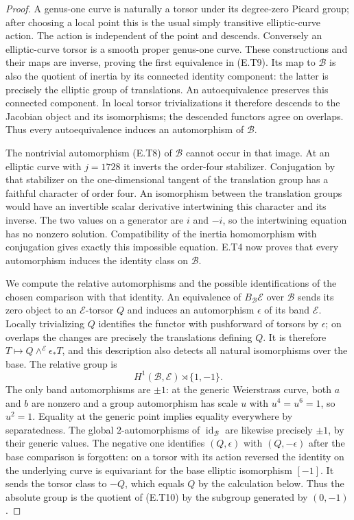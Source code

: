 \begin{proof}
A genus-one curve is naturally a torsor under its degree-zero
Picard group; after choosing a local point this is the usual
simply transitive elliptic-curve action.  The action is
independent of the point and descends.  Conversely an
elliptic-curve torsor is a smooth proper genus-one curve.
These constructions and their maps are inverse, proving
the first equivalence in (E.T9).  Its map to $\mathcal B$
is also the quotient of inertia by its connected identity
component: the latter is precisely the elliptic group of
translations.  An autoequivalence preserves this connected
component.  In local torsor trivializations it therefore
descends to the Jacobian object and its isomorphisms;
the descended functors agree on overlaps.  Thus every
autoequivalence induces an automorphism of $\mathcal B$.

The nontrivial automorphism (E.T8) of $\mathcal B$ cannot
occur in that image.  At an elliptic curve with $j=1728$
it inverts the order-four stabilizer.  Conjugation by
that stabilizer on the one-dimensional tangent of the
translation group has a faithful character of order four.
An isomorphism between the translation groups would have
an invertible scalar derivative intertwining this character
and its inverse.  The two values on a generator are $i$
and $-i$, so the intertwining equation has no nonzero
solution.  Compatibility of the inertia homomorphism
with conjugation gives exactly this impossible equation.
E.T4 now proves that every automorphism induces the
identity class on $\mathcal B$.

We compute the relative automorphisms and the possible
identifications of the chosen comparison with that identity.
An equivalence of $B_{\mathcal B}\mathcal E$ over
$\mathcal B$ sends its zero object to an $\mathcal E$-torsor
$Q$ and induces an automorphism $\epsilon$ of its band
$\mathcal E$.  Locally trivializing $Q$ identifies the
functor with pushforward of torsors by $\epsilon$;
on overlaps the changes are precisely the translations
defining $Q$.  It is therefore
$T\mapsto Q\mathbin{\wedge}^{\mathcal E}\epsilon_*T$,
and this description also detects all natural
isomorphisms over the base.  The relative group is
\[
 H^1(\mathcal B,\mathcal E)\rtimes\{1,-1\}.
 \tag{E.T10}
\]
The only band automorphisms are $\pm1$: at the generic
Weierstrass curve, both $a$ and $b$ are nonzero and a
group automorphism has scale $u$ with $u^4=u^6=1$,
so $u^2=1$.  Equality at the generic point implies equality
everywhere by separatedness.  The global $2$-automorphisms
of $\operatorname{id}_{\mathcal B}$ are likewise precisely
$\pm1$, by their generic values.  The negative one
identifies $(Q,\epsilon)$ with $(Q,-\epsilon)$ after
the base comparison is forgotten: on a torsor with its
action reversed the identity on the underlying curve
is equivariant for the base elliptic isomorphism $[-1]$.
It sends the torsor class to $-Q$, which equals $Q$
by the calculation below.  Thus the absolute group is
the quotient of (E.T10) by the subgroup generated by
$(0,-1)$.


\end{proof}
